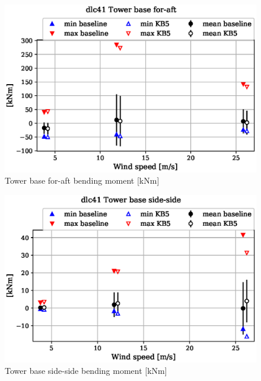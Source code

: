 \begin{figure}[!ht]
\begin{center}
	\includegraphics[width=.85\linewidth]{figures/baseline-vs-KB6/dlc41/tower-tower-node-001-momentvec-x_AA0008_AA0008.eps}
\end{center}
\caption{Tower base for-aft bending moment [kNm]}
\label{fig:baseline-vs-KB6:dlc41:tower-base-fa}
\end{figure}

\begin{figure}[!ht]
\begin{center}
	\includegraphics[width=.85\linewidth]{figures/baseline-vs-KB6/dlc41/tower-tower-node-001-momentvec-y_AA0008_AA0008.eps}
\end{center}
\caption{Tower base side-side bending moment [kNm]}
\label{fig:baseline-vs-KB6:dlc41:tower-base-ss}
\end{figure}

